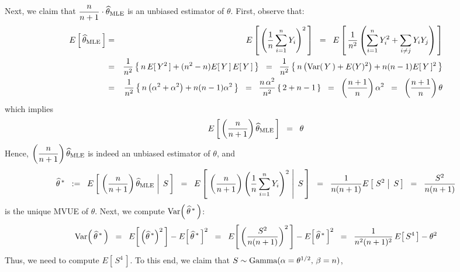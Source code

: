 Next, we claim that $\dfrac{n}{n+1}\cdot\widehat{\theta}_{\textnormal{MLE}}$ is an unbiased estimator of
$\theta$. First, observe that:
\begin{eqnarray*}
E\left[\,\widehat{\theta}_{\textnormal{MLE}}\,\right]
&=& E\left[\,\left(\dfrac{1}{n}\sum_{i=1}^{n}Y_{i}\right)^{2}\,\right]
\;\;=\;\; E\left[\,\dfrac{1}{n^{2}}\left(\sum_{i=1}^{n}Y_{i}^{2}+\sum_{i\neq j}Y_{i}Y_{j}\right)\,\right] \\
&=& \dfrac{1}{n^{2}}\left\{\,n \, E[\,Y^{2}\,] + (n^{2} - n) E[\,Y\,]\,E[\,Y\,]\,\right\}
\;\;=\;\; \dfrac{1}{n^{2}}\left\{\,n\left(\textnormal{Var}(\,Y\,) + E(Y)^{2}\right) + n(n-1) E[\,Y\,]^{2}\,\right\} \\
&=& \dfrac{1}{n^{2}}\left\{\,n\left(\alpha^{2} + \alpha^{2}\right) + n(n-1) \alpha^{2}\,\right\}
\;\;=\;\; \dfrac{n\,\alpha^{2}}{n^{2}}\left\{\,2 + n-1\,\right\}
\;\;=\;\; \left(\dfrac{n+1}{n}\right)\alpha^{2}
\;\;=\;\; \left(\dfrac{n+1}{n}\right)\theta
\end{eqnarray*}
which implies
\begin{equation*}
E\left[\,\left(\dfrac{n}{n+1}\right)\widehat{\theta}_{\textnormal{MLE}}\,\right] \;\; = \;\; \theta
\end{equation*}
Hence, $\left(\dfrac{n}{n+1}\right)\widehat{\theta}_{\textnormal{MLE}}$ is indeed an unbiased estimator of $\theta$,
and
\begin{equation*}
\widehat{\theta}^{\,*}
\;\; := \;\; E\left[\,\left.\left(\dfrac{n}{n+1}\right)\widehat{\theta}_{\textnormal{MLE}}\;\right\vert\;S\,\right]
\;\;  = \;\; E\left[\,\left.\left(\dfrac{n}{n+1}\right)\left(\dfrac{1}{n}\sum_{i=1}^{n}Y_{i}\right)^{2}\;\right\vert\;S\,\right]
\;\;  = \;\; \dfrac{1}{n(n+1)}E\left[\,\left.S^{2}\;\right\vert\;S\,\right]
\;\;  = \;\; \dfrac{S^{2}}{n(n+1)}
\end{equation*}
is the unique MVUE of $\theta$.
Next, we compute $\textnormal{Var}\!\left(\,\widehat{\theta}^{\,*}\,\right)$:
\begin{equation*}
\textnormal{Var}\!\left(\,\widehat{\theta}^{\,*}\,\right)
\;\;=\;\; E\!\left[\,\left(\widehat{\theta}^{\,*}\right)^{2}\,\right] - E\!\left[\,\widehat{\theta}^{\,*}\,\right]^{2}
\;\;=\;\; E\!\left[\,\left(\dfrac{S^{2}}{n(n+1)}\right)^{2}\,\right] - E\!\left[\,\widehat{\theta}^{\,*}\,\right]^{2}
\;\;=\;\; \dfrac{1}{n^{2}(n+1)^{2}}\,E\!\left[\,S^{4}\,\right] - \theta^{2}
\end{equation*}
Thus, we need to compute $E\!\left[\,S^{4}\,\right]$.
To this end, we claim that $S \sim \textnormal{Gamma}(\alpha = \theta^{1/2},\,\beta = n)$,
